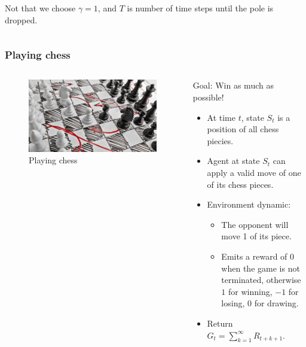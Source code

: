 \documentclass[10pt]{beamer}
\theoremstyle{remark}
\begin{document}
\begin{frame}
\begin{columns}
\begin{column}{0.7\textwidth}
\begin{itemize}
            Not that we choose $\gamma = 1$, and $T$ is number of time steps until the pole is dropped.
        \end{itemize}
    \end{column}
    \end{columns}

\end{frame}

\begin{frame}
    \frametitle{Playing chess}
    \begin{columns}
    \begin{column}{0.4\textwidth}
        \begin{figure}
            \includegraphics[width=\textwidth]{figures/motivation1.png}
            \caption{Playing chess}
        \end{figure}
    \end{column}
    \begin{column}{0.7\textwidth}  %
        Goal: Win as much as possible!

        \begin{itemize}
            \item At time $t$, state $S_t$ is a position of all chess piecies.
            \item Agent at state $S_t$ can apply a valid move of one of its chess pieces.
            \item Environment dynamic: 
                \begin{itemize}
                    \item The opponent will move 1 of its piece.
                    \item Emits a reward of $0$ when the game is not terminated, otherwise $1$ for winning, $-1$ for losing,  $0$ for drawing.
                \end{itemize}
            \item Return $G_t = \sum^{\infty}_{k=1} R_{t+k+1}$.

        \end{itemize}
    \end{column}
    \end{columns}
\end{frame}
\end{document}

